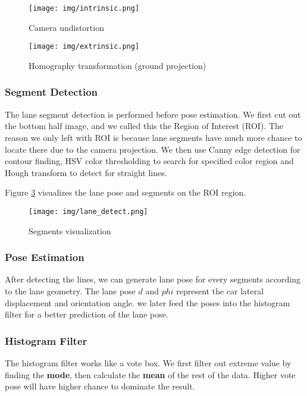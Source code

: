 \begin{spacing}{2.0}
\begin{figure}
	\centering
	\texttt{[image: img/intrinsic.png]}
	\caption{Camera undistortion}
	\label{fig:intrinsic}
\end{figure}

\begin{figure}	
	\centering
	\texttt{[image: img/extrinsic.png]}
	\caption{Homography transformation (ground projection)}
	\label{fig:extrinsic}
\end{figure}

\subsubsection{Segment Detection}

The lane segment detection is performed before pose estimation. We first cut out the bottom half image, and we called this the Region of Interest (ROI). The reason we only left with ROI is because lane segments have much more chance to locate there due to the camera projection. We then use Canny edge detection for contour finding, HSV color thresholding to search for specified color region and Hough transform to detect for straight lines.

Figure \ref{fig:lane_detect} visualizes the lane pose and segments on the ROI region.

\begin{figure}
	\centering
	\texttt{[image: img/lane\_detect.png]}
	\caption{Segments visualization}
	\label{fig:lane_detect}
\end{figure}

\subsubsection{Pose Estimation}

After detecting the lines, we can generate lane pose for every segments according to the lane geometry. The lane pose $d$ and $phi$ represent the car lateral displacement and orientation angle. we later feed the poses into the histogram filter for a better prediction of the lane pose.

\subsubsection{Histogram Filter}

The histogram filter works like a vote box. We first filter out extreme value by finding the \textbf{mode}, then calculate the \textbf{mean} of the rest of the data. Higher vote pose will have higher chance to dominate the result.


\end{spacing}
